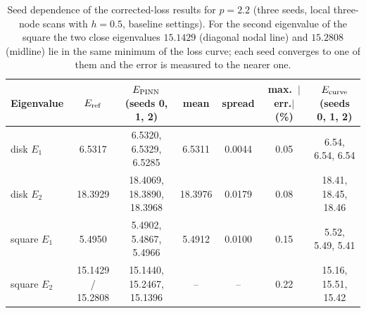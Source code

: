 \begin{table}[ht]
\centering
\begin{tabular}{lcccccc}
\toprule
Eigenvalue & $E_{\rm ref}$ & $E_{\rm PINN}$ (seeds 0, 1, 2) & mean & spread & max.\ $|$err.$|$ (\%) & $E_{\rm curve}$ (seeds 0, 1, 2) \\
\midrule
disk $E_1$ & 6.5317 & 6.5320, 6.5329, 6.5285 & 6.5311 & 0.0044 & 0.05 & 6.54, 6.54, 6.54 \\
disk $E_2$ & 18.3929 & 18.4069, 18.3890, 18.3968 & 18.3976 & 0.0179 & 0.08 & 18.41, 18.45, 18.46 \\
square $E_1$ & 5.4950 & 5.4902, 5.4867, 5.4966 & 5.4912 & 0.0100 & 0.15 & 5.52, 5.49, 5.41 \\
square $E_2$ & 15.1429 / 15.2808 & 15.1440, 15.2467, 15.1396 & -- & -- & 0.22 & 15.16, 15.51, 15.42 \\
\bottomrule
\end{tabular}
\caption{Seed dependence of the corrected-loss results for $p=2.2$ (three seeds, local three-node scans with $h=0.5$, baseline settings). For the second eigenvalue of the square the two close eigenvalues $15.1429$ (diagonal nodal line) and $15.2808$ (midline) lie in the same minimum of the loss curve; each seed converges to one of them and the error is measured to the nearer one.}
\label{tab.plap.seeds}
\end{table}

